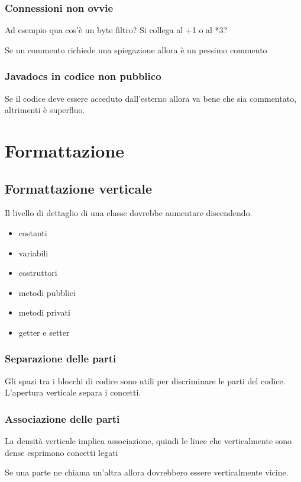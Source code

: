 \documentclass[11pt,a4paper]{book}
\begin{document}
\subsection{Connessioni non ovvie}
\label{code: 037}
Ad esempio qua cos'è un byte filtro? Si collega al +1 o al *3?

Se un commento richiede una spiegazione allora è un pessimo commento

\subsection{Javadocs in codice non pubblico}
Se il codice deve essere acceduto dall'esterno allora va bene che sia commentato, altrimenti è superfluo.

\chapter{Formattazione}
\section{Formattazione verticale}
Il livello di dettaglio di una classe dovrebbe aumentare discendendo.
\begin{itemize}
	\item costanti
	\item variabili
	\item costruttori
	\item metodi pubblici
	\item metodi privati
	\item getter e setter
\end{itemize}

\subsection{Separazione delle parti}
Gli spazi tra i blocchi di codice sono utili per discriminare le parti del codice. L'apertura verticale separa i concetti.

\subsection{Associazione delle parti}
La densità verticale implica associazione, quindi le linee che verticalmente sono dense esprimono concetti legati

Se una parte ne chiama un'altra allora dovrebbero essere verticalmente vicine.
\end{document}

